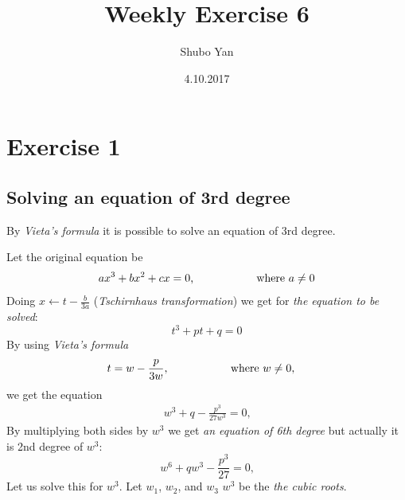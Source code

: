 \documentclass[a4paper,12pt]{article}
\title{ Weekly Exercise 6}
\author{Shubo Yan }
\date{4.10.2017}
\begin{document}
\maketitle
\newpage
\section*{Exercise 1}

\subsection*{Solving an equation of 3rd degree} 

By \emph{Vieta\!'s formula} it is possible to solve an equation of 3rd degree. 

Let the original equation be 
\begin{align}
ax^{3}+bx^{2}+cx=0 \text{,\hspace{2cm}where }a\ne 0
\end{align}
Doing $x\displaystyle\leftarrow t-\frac{b}{3a}$ (\emph{T\!schirnhaus transformation}) we get for \emph{the equation to be solved}:
\begin{equation}
t^{3}+pt+q=0 
\end{equation}
By using \emph{Vieta\!'s formula}
\begin{align}
t=w-\frac{p}{3w}&\text{,\hspace{2cm}where }w\ne 0\text{,}
\end{align}
we get the equation
\begin{align}
w^{3}+q-\frac{p^{3}}{27w^{3}}=0\text{,}
\end{align}
By multiplying both sides by $w^{3}$ we get \emph{an equation of 6th degree} but actually it is 2nd degree of $w^{3}$:
\begin{equation}
w^{6}+qw^{3}-\frac{p^{3}}{27}=0\text{,}
\end{equation}
Let us solve this for $w^{3}$. Let $w_1$, $w_2$, and $w_3$ $w^{3}$ be the \emph{the cubic roots}.
\end{document}
